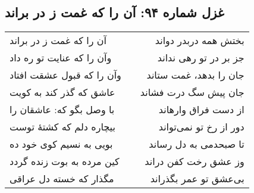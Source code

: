 \begin{center}
\section*{غزل شماره ۹۴: آن را که غمت ز در براند}
\label{sec:094}
\begin{longtable}{l p{0.5cm} r}
آن را که غمت ز در براند
&&
بختش همه دربدر دواند
\\
وآن را که عنایت تو ره داد
&&
جز بر در تو رهی نداند
\\
وآن را که قبول عشقت افتاد
&&
جان را بدهد، غمت ستاند
\\
عاشق که گذر کند به کویت
&&
جان پیش سگ درت فشاند
\\
با وصل بگو که: عاشقان را
&&
از دست فراق وارهاند
\\
بیچاره دلم که کشتهٔ توست
&&
دور از رخ تو نمی‌تواند
\\
بویی به نسیم کوی خود ده
&&
تا صبحدمی به دل رساند
\\
کین مرده به بوت زنده گردد
&&
وز عشق رخت کفن دراند
\\
مگذار که خسته دل عراقی
&&
بی‌عشق تو عمر بگذراند
\\
\end{longtable}
\end{center}
